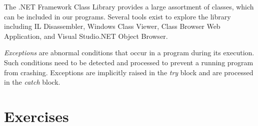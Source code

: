 The .NET Framework Class Library provides a large assortment of
classes, which can be included in our programs. Several tools
exist to explore the library including IL Disassembler, Windows
Class Viewer, Class Browser Web Application, and Visual Studio.NET
Object Browser.

\emph{Exceptions} are abnormal conditions that occur in a program
during its execution. Such conditions need to be detected and
processed to prevent a running program from crashing. Exceptions
are implicitly raised in the \emph{try} block and are processed in
the \emph{catch} block.

\newpage
{\samepage\vspace{1ex}\noindent\usebox{\phicsep}\vspace{1.5ex}}
\vspace{-0.4in}
\section{Exercises}



